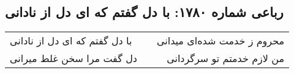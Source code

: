 \begin{center}
\section*{رباعی شماره ۱۷۸۰: با دل گفتم که ای دل از نادانی}
\label{sec:1780}
\begin{longtable}{l p{0.5cm} r}
با دل گفتم که ای دل از نادانی
&&
محروم ز خدمت شده‌ای میدانی
\\
دل گفت مرا سخن غلط میرانی
&&
من لازم خدمتم تو سرگردانی
\\
\end{longtable}
\end{center}
